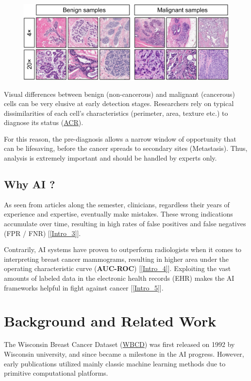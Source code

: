 \documentclass[12pt]{article}
\numberwithin{equation}{section}
\begin{document}
\begin{flushleft}
\begin{figure}[H]
\centering
\includegraphics[scale=0.375]{Benign_Malignant.png}
\end{figure} 
Visual differences between benign (non-cancerous) and malignant (cancerous) cells can be very elusive at early detection stages. Researchers rely on typical dissimilarities of each cell's characteristics (perimeter, area, texture etc.) to diagnose its status (\href{https://www.radiologyinfo.org/en/info.cfm?pg=breast-cancer}{ACR}).

For this reason, the pre-diagnosis allows a narrow window of opportunity that can be lifesaving, before the cancer spreads to secondary sites (Metastasis). Thus, analysis is extremely important and should be handled by experts only.

\newpage

\subsection{Why AI ?}

As seen from articles along the semester, clinicians, regardless their years of experience and expertise, eventually make mistakes. These wrong indications accumulate over time, resulting in high rates of false positives and false negatives (FPR / FNR) [\ref{Intro_3}]. 

Contrarily, AI systems have proven to outperform radiologists when it comes to interpreting breast cancer mammograms, resulting in higher area under the operating characteristic curve (\textbf{AUC-ROC}) [\ref{Intro_4}]. Exploiting the vast amounts of labeled data in the electronic health records (EHR) makes the AI frameworks helpful in fight against cancer [\ref{Intro_5}].

\section{Background and Related Work}
The Wisconsin Breast Cancer Dataset (\href{https://archive.ics.uci.edu/ml/datasets/Breast+Cancer+Wisconsin+(Diagnostic)}{WBCD}) was first released on 1992 by Wisconsin university, and since became a milestone in the AI progress. However, early publications utilized mainly classic machine learning methods due to primitive computational platforms. 


\end{flushleft}
\end{document}
